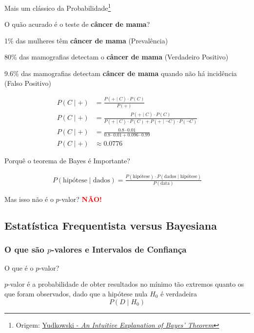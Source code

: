\begin{frame}{Mais um clássico da Probabilidade\footnote{Origem: \href{https://www.yudkowsky.net/rational/bayes}{Yudkowski - \textit{An Intuitive Explanation of Bayes’ Theorem}}}}
    \begin{exemplo}
        \small
        O quão acurado é o teste de \textbf{câncer de mama}?
        \begin{vfilleditems}
            \item \footnotesize 1\% das mulheres têm \textbf{câncer de mama} (Prevalência)
            \item \footnotesize 80\% das mamografias detectam o \textbf{câncer de mama} (Verdadeiro Positivo)
            \item \footnotesize 9.6\% das mamografias detectam \textbf{câncer de mama} quando não há incidência (Falso Positivo)
        \end{vfilleditems}
        $$
        \begin{aligned}
            P(C \mid +) &= \frac{P(+ \mid C) \cdot P(C)}{P(+)} \\
            P(C \mid +) &= \frac{P(+ \mid C) \cdot P(C)}{P(+ \mid C) \cdot P(C) + P(+ \mid \neg C) \cdot P(\neg C)} \\
            P(C \mid +) &= \frac{0.8 \cdot 0.01}{0.8 \cdot 0.01 + 0.096 \cdot 0.99} \\
            P(C \mid +) &\approx 0.0776
        \end{aligned}
        $$
    \end{exemplo}
\end{frame}


\begin{frame}{Porquê o teorema de Bayes é Importante?}
    \begin{idea}
        $$
        \begin{aligned}
            P(\text{hipótese} \mid \text{dados}) = \frac{P(\text{hipótese}) \cdot P(\text{dados} \mid \text{hipótese})}{P(\text{data})}
        \end{aligned}
        $$
    \end{idea}
    Mas isso não é o $p$-valor? \textcolor{red}{\textbf{NÃO!}}
\end{frame}

\subsection{Estatística Frequentista versus Bayesiana}
\subsubsection{O que são $p$-valores e Intervalos de Confiança}
\begin{frame}{O que é o $p$-valor?}
    \begin{defn}[$p$-valor]
        $p$-valor é a probabilidade de obter resultados no mínimo tão
        extremos quanto os que foram observados, dado que a hipótese nula
        $H_0$ é verdadeira
        $$P(D \mid H_0)$$
    \end{defn}
\end{frame}

